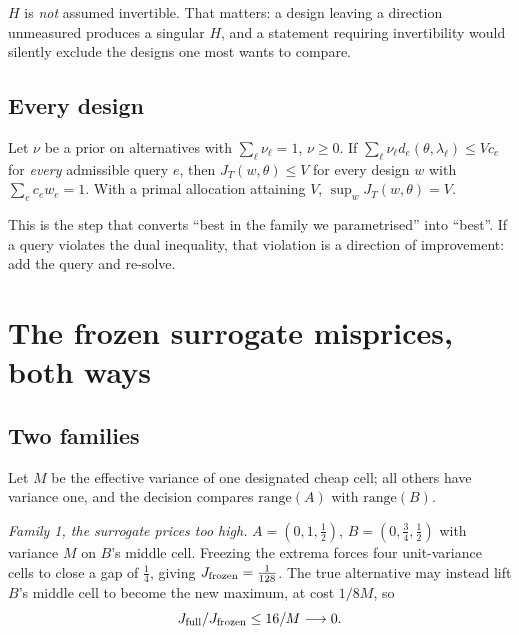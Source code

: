 
$H$ is \emph{not} assumed invertible. That matters: a design leaving a direction unmeasured
produces a singular $H$, and a statement requiring invertibility would silently exclude the
designs one most wants to compare.

\subsection{Every design}

\begin{theorem}
\label{thm:dual}
Let $\nu$ be a prior on alternatives with $\sum_{\ell}\nu_{\ell}=1$, $\nu\ge0$. If
$\sum_{\ell}\nu_{\ell}d_{e}(\theta,\lambda_{\ell})\le Vc_{e}$ for \emph{every} admissible
query $e$, then $J_{T}(w,\theta)\le V$ for every design $w$ with
$\sum_{e}c_{e}w_{e}=1$. With a primal allocation attaining $V$, $\sup_{w}J_{T}(w,\theta)=V$.
\end{theorem}


This is the step that converts ``best in the family we parametrised'' into ``best''. If a
query violates the dual inequality, that violation is a direction of improvement: add the
query and re-solve.

\section{The frozen surrogate misprices, both ways}
\label{sec:proxy}

\subsection{Two families}

Let $M$ be the effective variance of one designated cheap cell; all others have variance
one, and the decision compares $\mathrm{range}(A)$ with $\mathrm{range}(B)$.

\emph{Family 1, the surrogate prices too high.} $A=(0,1,\tfrac12)$, $B=(0,\tfrac34,\tfrac12)$
with variance $M$ on $B$'s middle cell. Freezing the extrema forces four unit-variance cells
to close a gap of $\tfrac14$, giving $J_{\rm frozen}=\tfrac1{128}$. The true alternative may
instead lift $B$'s middle cell to become the new maximum, at cost $1/8M$, so
\begin{equation}
J_{\rm full}/J_{\rm frozen}\le 16/M\longrightarrow0 .
\label{eq:fam1}
\end{equation}

